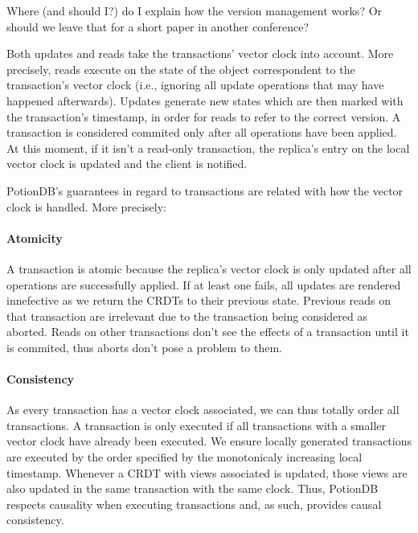 \documentclass{vldb}
\newcommand{\grumbler}[2]{{\color{red}{\bf #1:} #2}}
\newcommand{\andre}[1]{\grumbler{andre}{#1}}
\begin{document}
\andre{Where (and should I?) do I explain how the version management works? Or should we leave that for a short paper in another conference?}

Both updates and reads take the transactions' vector clock into account.
More precisely, reads execute on the state of the object correspondent to the transaction's vector clock (i.e., ignoring all update operations that may have happened afterwards).
Updates generate new states which are then marked with the transaction's timestamp, in order for reads to refer to the correct version.
A transaction is considered commited only after all operations have been applied. 
At this moment, if it isn't a read-only transaction, the replica's entry on the local vector clock is updated and the client is notified.

PotionDB's guarantees in regard to transactions are related with how the vector clock is handled. More precisely:


\paragraph{Atomicity}  A transaction is atomic because the replica's vector clock is only updated after all operations are successfully applied. 
If at least one fails, all updates are rendered innefective as we return the CRDTs to their previous state.
Previous reads on that transaction are irrelevant due to the transaction being considered as aborted.
Reads on other transactions don't see the effects of a transaction until it is commited, thus aborts don't pose a problem to them.

\paragraph{Consistency} As every transaction has a vector clock associated, we can thus totally order all transactions. 
A transaction is only executed if all transactions with a smaller vector clock have already been executed. 
We ensure locally generated transactions are executed by the order specified by the monotonicaly increasing local timestamp.
Whenever a CRDT with views associated is updated, those views are also updated in the same transaction with the same clock.
Thus, PotionDB respects causality when executing transactions and, as such, provides causal consistency.
\end{document}
